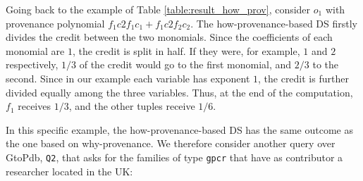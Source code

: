\documentclass[preprint,12pt,sort&compress]{elsarticle}
\newcommand{\rone}[1]{\textcolor{reviewer1}{#1}}
\newcommand{\eat}[1]{}
\begin{document}
%

\eat{The how-provenance-based DS first distributes the credit to the monomials of the polynomial accordingly to the weight represented by their coefficients, then to the single tuples in every monomial accordingly to the weights represented by their exponents. }

Going back to the example of Table \ref{table:result_how_prov}, consider $o_1$ with provenance polynomial $f_1 c2f_1 c_1 + f_1 c2f_2 c_2$. The how-provenance-based DS firstly divides the credit between the two monomials. Since the coefficients of each monomial are $1$, the credit is split in half. If they were, for example, $1$ and $2$ respectively, $1/3$ of the credit would go to the first monomial, and $2/3$ to the second.  
Since in our example each variable has exponent $1$, the credit is further divided equally among the three variables. Thus, at the end of the computation, $f_1$ receives $1/3$, and the other tuples receive $1/6$.



In this specific example, the how-provenance-based DS has the same outcome as the one based on why-provenance. %
We therefore consider another query over GtoPdb, \texttt{Q2}, that asks for the families of type \texttt{gpcr} that have as contributor a researcher located in the UK:
\end{document}

